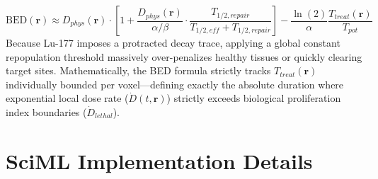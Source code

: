 \documentclass[11pt,a4paper]{article}
\begin{document}
\begin{equation}
    \text{BED}(\mathbf{r}) \approx D_{phys}(\mathbf{r}) \cdot \left[ 1 + \frac{D_{phys}(\mathbf{r})}{\alpha/\beta} \cdot \frac{T_{1/2, repair}}{T_{1/2, eff} + T_{1/2, repair}} \right] - \frac{\ln(2)}{\alpha} \frac{T_{treat}(\mathbf{r})}{T_{pot}}
\end{equation}
Because Lu-177 imposes a protracted decay trace, applying a global constant repopulation threshold massively over-penalizes healthy tissues or quickly clearing target sites. Mathematically, the BED formula strictly tracks $T_{treat}(\mathbf{r})$ individually bounded per voxel—defining exactly the absolute duration where exponential local dose rate ($\dot{D}(t, \mathbf{r})$) strictly exceeds biological proliferation index boundaries ($\dot{D}_{lethal}$).

\section{SciML Implementation Details}
\end{document}
